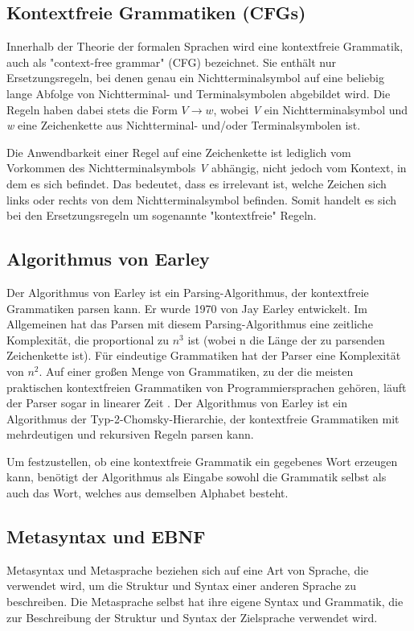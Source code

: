 \subsection*{Kontextfreie Grammatiken (CFGs)}
Innerhalb der Theorie der formalen Sprachen wird eine kontextfreie Grammatik, auch als "context-free grammar" (CFG) bezeichnet. 
Sie enthält nur Ersetzungsregeln, bei denen genau ein Nichtterminalsymbol auf eine beliebig lange Abfolge von Nichtterminal- und Terminalsymbolen abgebildet wird.
Die Regeln haben dabei stets die Form $V \rightarrow w$, wobei \textit{V} ein Nichtterminalsymbol und \textit{w} eine Zeichenkette aus Nichtterminal- und/oder Terminalsymbolen ist.

Die Anwendbarkeit einer Regel auf eine Zeichenkette ist lediglich vom Vorkommen des Nichtterminalsymbols \textit{V} abhängig, nicht jedoch vom Kontext, in dem es 
sich befindet. Das bedeutet, dass es irrelevant ist, welche Zeichen sich links oder rechts von dem Nichtterminalsymbol befinden. Somit handelt es sich bei 
den Ersetzungsregeln um sogenannte "kontextfreie" Regeln.

\subsection*{Algorithmus von Earley}
Der Algorithmus von Earley ist ein Parsing-Algorithmus, der kontextfreie Grammatiken parsen kann. Er wurde 1970 von Jay Earley entwickelt.
Im Allgemeinen hat das Parsen mit diesem Parsing-Algorithmus eine zeitliche Komplexität, die proportional zu $n^3$ ist (wobei n die Länge der zu parsenden 
Zeichenkette ist). Für eindeutige Grammatiken hat der Parser eine Komplexität von $n^2$. Auf einer großen Menge von Grammatiken, zu der die 
meisten praktischen kontextfreien Grammatiken von Programmiersprachen gehören, läuft der Parser sogar in linearer Zeit \cite{Earley1970}. 
Der Algorithmus von Earley ist ein Algorithmus der Typ-2-Chomsky-Hierarchie, der kontextfreie Grammatiken mit mehrdeutigen und rekursiven Regeln parsen kann. 

Um festzustellen, ob eine kontextfreie Grammatik ein gegebenes Wort erzeugen kann, benötigt der Algorithmus als Eingabe sowohl die Grammatik selbst 
als auch das Wort, welches aus demselben Alphabet besteht.

\subsection*{Metasyntax und EBNF}

Metasyntax und Metasprache beziehen sich auf eine Art von Sprache, die verwendet wird, um die Struktur und Syntax einer anderen Sprache zu beschreiben. 
Die Metasprache selbst hat ihre eigene Syntax und Grammatik, die zur Beschreibung der Struktur und Syntax der Zielsprache verwendet wird. \cite{Feynman2016}

